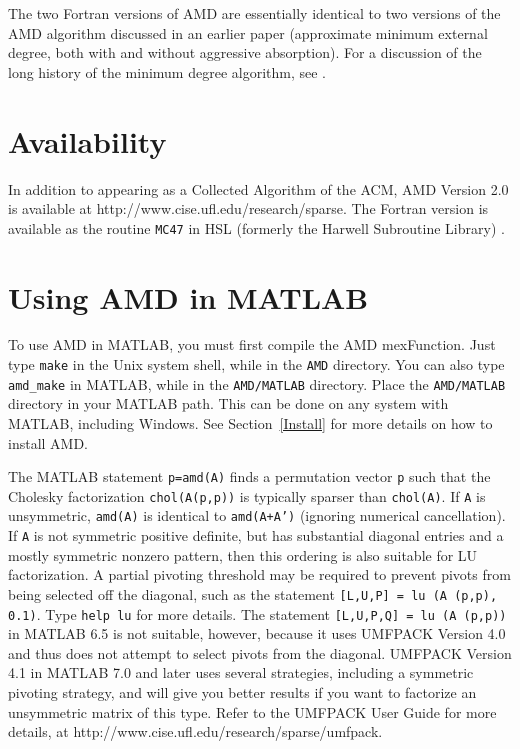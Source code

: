 \documentclass[11pt]{article}
\begin{document}
The two Fortran versions of AMD are essentially identical to two versions of
the AMD algorithm discussed in an earlier paper \cite{AmestoyDavisDuff96}
(approximate minimum external degree, both with and without aggressive
absorption).
For a discussion of the long history of the minimum degree algorithm,
see \cite{GeorgeLiu89}.

\section{Availability}

In addition to appearing as a Collected Algorithm of the ACM,
AMD Version 2.0 is available at http://www.cise.ufl.edu/research/sparse.
The Fortran version is available as the routine {\tt MC47} in HSL
(formerly the Harwell Subroutine Library) \cite{hsl:2002}.

\section{Using AMD in MATLAB}

To use AMD in MATLAB, you must first compile the AMD mexFunction.
Just type {\tt make} in the Unix system shell, while in the {\tt AMD}
directory.  You can also type {\tt amd\_make} in MATLAB, while in the
{\tt AMD/MATLAB} directory.  Place the {\tt AMD/MATLAB} directory in your
MATLAB path.  This can be done on any system with MATLAB, including Windows.
See Section~\ref{Install} for more details on how to install AMD.

The MATLAB statement {\tt p=amd(A)} finds a permutation vector {\tt p} such
that the Cholesky factorization {\tt chol(A(p,p))} is typically sparser than
{\tt chol(A)}.
If {\tt A} is unsymmetric, {\tt amd(A)} is identical to {\tt amd(A+A')}
(ignoring numerical cancellation).
If {\tt A} is not symmetric positive definite,
but has substantial diagonal entries and a mostly symmetric nonzero pattern,
then this ordering is also suitable for LU factorization.  A partial pivoting
threshold may be required to prevent pivots from being selected off the
diagonal, such as the statement {\tt [L,U,P] = lu (A (p,p), 0.1)}.
Type {\tt help lu} for more details.
The statement {\tt [L,U,P,Q] = lu (A (p,p))} in MATLAB 6.5 is
not suitable, however, because it uses UMFPACK Version 4.0 and thus
does not attempt to select pivots from the diagonal.
UMFPACK Version 4.1 in MATLAB 7.0 and later
uses several strategies, including a symmetric pivoting strategy, and
will give you better results if you want to factorize an unsymmetric matrix
of this type.  Refer to the UMFPACK User Guide for more details, at
http://www.cise.ufl.edu/research/sparse/umfpack.
\end{document}
